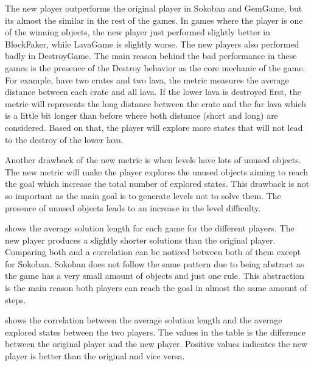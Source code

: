 The new player outperforms the original player in Sokoban and GemGame, but its almost the similar in the rest of the games. In games where the player is one of the winning objects, the new player just performed slightly better in BlockFaker, while LavaGame is slightly worse. The new players also performed badly in DestroyGame. The main reason behind the bad performance in these games is the presence of the Destroy behavior as the core mechanic of the game. For example,  have two crates and two lava, the metric measures the average distance between each crate and all lava. If the lower lava is destroyed first, the metric will represents the long distance between the crate and the far lava which is a little bit longer than before where both distance (short and long) are considered. Based on that, the player will explore more states that will not lead to the destroy of the lower lava.


Another drawback of the new metric is when levels have lots of unused objects. The new metric will make the player explores the unused objects aiming to reach the goal which increase the total number of explored states. This drawback is not so important as the main goal is to generate levels not to solve them. The presence of unused objects leads to an increase in the level difficulty.\\\par

 shows the average solution length for each game for the different players. The new player produces  a slightly shorter solutions than the original player. Comparing both  and  a correlation can be noticed between both of them except for Sokoban. Sokoban does not follow the same pattern due to being abstract as the game has a very small amount of objects and just one rule. This abstraction is the main reason both players can reach the goal in almost the same amount of steps.


 shows the correlation between the average solution length and the average explored states between the two players. The values in the table is the difference between the original player and the new player. Positive values indicates the new player is better than the original and vice versa.

